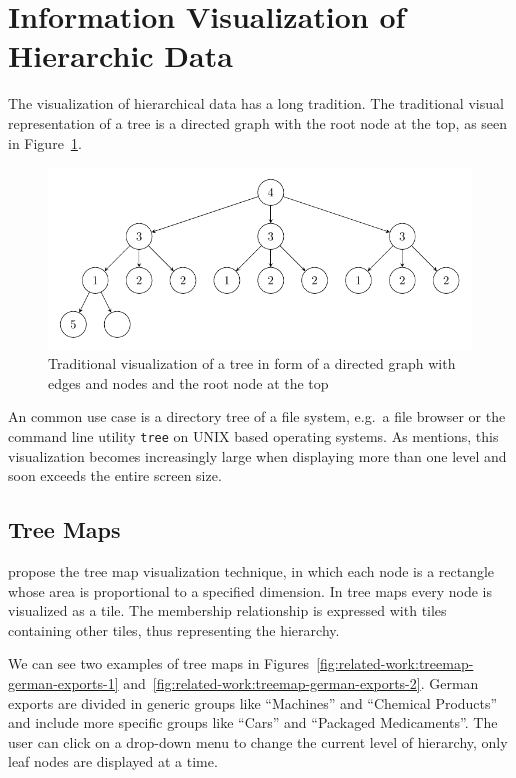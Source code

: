 \section{Information Visualization of Hierarchic Data}
The visualization of hierarchical data has a long tradition.
The traditional visual representation of a tree is a directed graph with the root node at the top, as seen in Figure~\ref{fig:related-work:tree-graph}.
\begin{figure}[ht]
  \centering
  \caption{Traditional visualization of a tree in form of a directed graph with edges and nodes and the root node at the top}
  \label{fig:related-work:tree-graph}
  \includegraphics[width=\textwidth]{figures/related-work/tree.pdf}
\end{figure}
An common use case is a directory tree of a file system, e.g.\ a file browser or the command line utility \texttt{tree} on UNIX based operating systems.
As \textcite{Shneiderman1992} mentions, this visualization becomes increasingly large when displaying more than one level and soon exceeds the entire screen size.

\subsection{Tree Maps}
\textcite{Johnson1991} propose the tree map visualization technique, in which each node is a rectangle whose area is proportional to a specified dimension.
In tree maps every node is visualized as a tile.
The membership relationship is expressed with tiles containing other tiles, thus representing the hierarchy.

We can see two examples of tree maps in Figures~\ref{fig:related-work:treemap-german-exports-1} and~\ref{fig:related-work:treemap-german-exports-2}.
German exports are divided in generic groups like ``Machines'' and ``Chemical Products'' and include more specific groups like ``Cars'' and ``Packaged Medicaments''.
The user can click on a drop-down menu to change the current level of hierarchy, only leaf nodes are displayed at a time.

